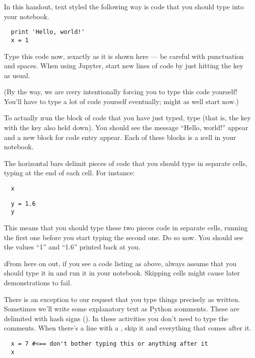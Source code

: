 \documentclass[letterpaper, 12pt, titlepage, twoside]{article}
\begin{document}
In this handout, text styled the following way is code that you should type
into your notebook.

\begin{lstlisting}
  print 'Hello, world!'
  x = 1
\end{lstlisting}

Type this code now, \i{exactly} as it is shown here --- be careful with
punctuation and spaces. When using Jupyter, start new lines of code by just
hitting the  key as usual.

(By the way, we are \i{very intentionally} forcing you to type this code
yourself! You'll have to type a lot of code yourself eventually; might as well
start now.)

To actually \i{run} the block of code that you have just typed, type
 (that is, the  key with the  key also held
down). You should see the message ``Hello, world!'' appear and a new block for
code entry appear. Each of these blocks is a \i{cell} in your notebook.

The horizontal bars delimit pieces of code that you should type in separate
cells, typing  at the end of each cell. For instance:

\begin{lstlisting}
  x
\end{lstlisting}
\begin{lstlisting}
  y = 1.6
  y
\end{lstlisting}

This means that you should type these two pieces code in separate cells,
running the first one before you start typing the second one. Do so now. You
should see the values ``1'' and ``1.6'' printed back at you.

\i{From here on out, if you see a code listing as above, always assume that
  you should type it in and run it in your notebook. Skipping cells might
  cause later demonstrations to fail.}

There is an exception to our request that you type things precisely as
written. Sometimes we'll write some explanatory text as Python \i{comments}.
These are delimited with hash signs (\s{\#}). In these activities you don't
need to type the comments. When there's a line with a \s{\#}, skip it and
everything that comes after it.

\begin{lstlisting}
  x = 7 #<== don't bother typing this or anything after it
  x
\end{lstlisting}
\end{document}
